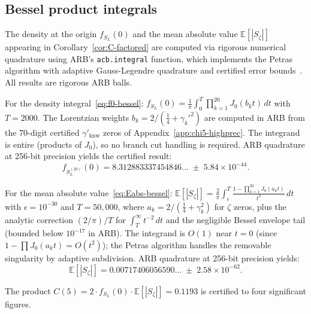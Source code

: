 \documentclass[12pt,reqno]{amsart}
\theoremstyle{plain}
\theoremstyle{definition}
\theoremstyle{remark}
\newcommand{\E}{\mathbb{E}}
\begin{document}
\subsection{Bessel product integrals}\label{subsec:bessel-integrals}

The density at the origin $f_{S_L}(0)$ and the mean absolute value $\E[|S_\zeta|]$ appearing in Corollary~\ref{cor:C-factored} are computed via rigorous numerical quadrature using ARB's \texttt{acb.integral} function, which implements the Petras algorithm with adaptive Gauss-Legendre quadrature and certified error bounds~\cite{Johansson2017}.  All results are rigorous ARB balls.

For the density integral~\eqref{eq:f0-bessel}: $f_{S_L}(0) = \frac{1}{\pi}\int_0^{T} \prod_{k=1}^{20} J_0(b_k t)\,dt$ with $T = 2000$.  The Lorentzian weights $b_k = 2/(\tfrac{1}{4} + {\gamma_k'}^2)$ are computed in ARB from the 70-digit certified $\gamma'_{\mathrm{knw}}$ zeros of Appendix~\ref{app:chi5-highprec}.  The integrand is entire (products of $J_0$), so no branch cut handling is required.  ARB quadrature at 256-bit precision yields the certified result:
\[
  f_{S_L^{(20)}}(0) = 8.312883337454846\ldots \;\pm\; 5.84 \times 10^{-44}.
\]

For the mean absolute value~\eqref{eq:Eabs-bessel}: $\E[|S_\zeta|] = \frac{2}{\pi}\int_\epsilon^{T} \frac{1 - \prod_{k=1}^{20} J_0(a_k t)}{t^2}\,dt$ with $\epsilon = 10^{-30}$ and $T = 50{,}000$, where $a_k = 2/(\tfrac{1}{4} + \gamma_k^2)$ for $\zeta$ zeros, plus the analytic correction $(2/\pi)/T$ for $\int_T^\infty t^{-2}\,dt$ and the negligible Bessel envelope tail (bounded below $10^{-17}$ in ARB).  The integrand is $O(1)$ near $t = 0$ (since $1 - \prod J_0(a_k t) = O(t^2)$); the Petras algorithm handles the removable singularity by adaptive subdivision.  ARB quadrature at 256-bit precision yields:
\[
  \E[|S_\zeta|] = 0.00717406056590\ldots \;\pm\; 2.58 \times 10^{-62}.
\]

The product $C(5) = 2 \cdot f_{S_L}(0) \cdot \E[|S_\zeta|] = 0.1193$ is certified to four significant figures.
\end{document}
